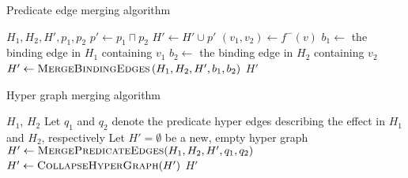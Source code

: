 \documentclass[../Master.tex]{subfiles}
\begin{document}
\begin{algorithm}
    \caption{Predicate edge merging algorithm}
    \label{algo:prededgemerge}

    \begin{algorithmic}
         {$H_1, H_2, H', p_1, p_2$}
            \State $p' \gets p_1 \sqcap p_2$
            \State $H' \gets H' \cup p'$
                    \State $\left( v_1, v_2 \right) \gets f^-\left( v \right)$
                    \State $b_1 \gets$ the binding edge in $H_1$ containing $v_1$
                    \State $b_2 \gets$ the binding edge in $H_2$ containing $v_2$
                    \State $H' \gets \textsc{MergeBindingEdges}
                        \left( H_1, H_2, H', b_1, b_2 \right)$
                \EndIf
            \EndFor
            \State \Return $H'$
        \EndFunction
    \end{algorithmic}
\end{algorithm}

\begin{algorithm}
    \caption{Hyper graph merging algorithm}
    \label{algo:hypergraphmerge}
    \begin{algorithmic}
         {$H_1$, $H_2$}
            \State Let $q_1$ and $q_2$ denote the predicate hyper edges describing the effect in $H_1$ and $H_2$, respectively
            \State Let $H' = \emptyset$ be a new, empty hyper graph
            \State $H' \gets \textsc{MergePredicateEdges}(H_1,H_2,H',q_1,q_2)$
            \State $H' \gets \textsc{CollapseHyperGraph}(H')$
            \State \Return $H'$
        \EndFunction
    \end{algorithmic}
\end{algorithm}
\end{document}
